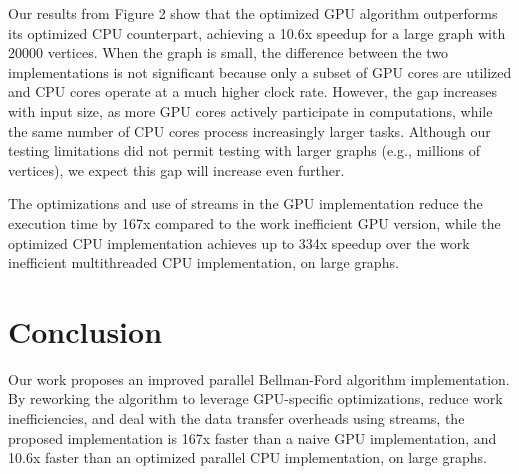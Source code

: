 \documentclass[twocolumn]{article}
\begin{document}
Our results from Figure 2 show that the optimized GPU algorithm outperforms its optimized CPU counterpart, achieving a 10.6x speedup for a large graph with 20000 vertices. When the graph is small, the difference between the two implementations is not significant because only a subset of GPU cores are utilized and CPU cores operate at a much higher clock rate. However, the gap increases with input size, as more GPU cores actively participate in computations, while the same number of CPU cores process increasingly larger tasks. Although our testing limitations did not permit testing with larger graphs (e.g., millions of vertices), we expect this gap will increase even further.

The optimizations and use of streams in the GPU implementation reduce the execution time by 167x compared to the work inefficient GPU version, while the optimized CPU implementation achieves up to 334x speedup over the work inefficient multithreaded CPU implementation, on large graphs.

\section{Conclusion}
Our work proposes an improved parallel Bellman-Ford algorithm implementation. By reworking the algorithm to leverage GPU-specific optimizations, reduce work inefficiencies, and deal with the data transfer overheads using streams, the proposed implementation is 167x faster than a naive GPU implementation, and 10.6x faster than an optimized parallel CPU implementation, on large graphs.

\printbibliography
\end{document}

